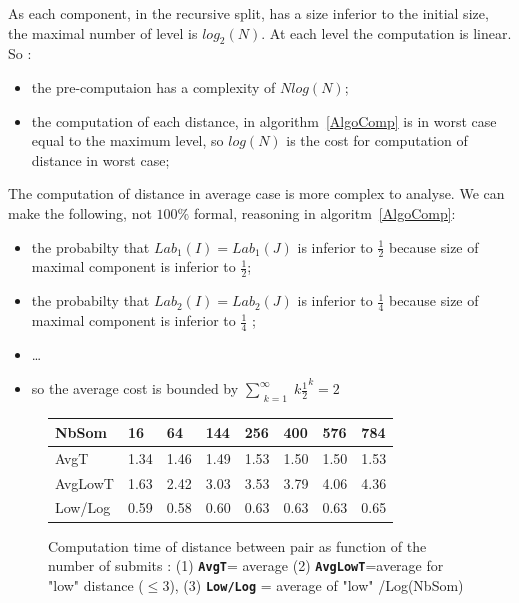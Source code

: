 \documentclass[a4paper]{article}
\begin{document}
As each component, in the recursive split, has a size inferior to the initial size,
the maximal number of level is $log_2(N)$.  At each level the computation is linear.
So :

\begin{itemize}
   \item  the pre-computaion has a complexity of $N log(N)$;
   \item  the computation of each distance, in algorithm~\ref{AlgoComp} is in worst case equal to 
          the maximum level, so $log(N)$ is the cost for computation of distance in worst case;
\end{itemize} 

The computation of distance in average case is more complex to analyse. We
can make the following, not $100\%$ formal, reasoning in algoritm~\ref{AlgoComp}:

\begin{itemize}
   \item  the probabilty that  $Lab_1(I)=Lab_1(J)$ is inferior  to $\frac{1}{2}$ because size
          of maximal component is inferior to $\frac{1}{2}$;
   \item  the probabilty that  $Lab_2(I)=Lab_2(J)$ is inferior  to $\frac{1}{4}$ because size
          of maximal component is inferior to $\frac{1}{4}$ ;
   \item  \dots 
   \item  so the average cost is bounded by $\sum\limits_{\substack{k=1}}^{\infty} k \frac{1}{2}^k = 2$
\end{itemize}


\begin{figure}
\centering
\begin{tabular}{| l || l |l | l | l | l | l | l |}
   \hline
   NbSom        & 16     & 64     & 144    &    256 &   400 &   576     & 784   \\ \hline \hline
   AvgT         & 1.34   & 1.46   & 1.49   &   1.53 &  1.50 &   1.50   & 1.53   \\ \hline
   AvgLowT      & 1.63   & 2.42   & 3.03   &   3.53 &  3.79 &   4.06   & 4.36   \\ \hline
   Low/Log  & 0.59   & 0.58   &  0.60  &    0.63 & 0.63 &   0.63   &  0.65      \\ \hline 
\end{tabular}
\caption{Computation time of distance between pair as function of the number of submits : (1) {\tt \bf AvgT}= average 
(2) {\tt \bf  AvgLowT}=average for "low" distance ($\leq 3$), (3) {\tt \bf Low/Log} =  average of "low" /Log(NbSom)}
\label{ExpCalc}
\end{figure}
\end{document}
